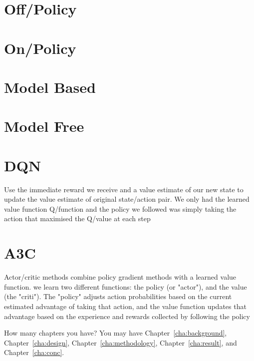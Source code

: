 \section{Off\-/Policy}

\section{On\-/Policy}

\section{Model Based}

\section{Model Free}

\section{DQN}
Use the immediate reward we receive and a value estimate of our new state to update the value estimate of original state\-/action pair. We only had the learned value function Q\-/function and the policy we followed was simply taking the action that maximised the Q\-/value at each step

\section{A3C}
Actor\-/critic methods combine policy gradient methods with a learned value function.
we learn two different functions: the policy (or "actor"), and the value (the "criti"). The "policy" adjusts action probabilities based on the current estimated advantage of taking that action, and the value function updates that advantage based on the experience and rewards collected by following the policy

How many chapters you have? You may have Chapter~\ref{cha:background},
Chapter~\ref{cha:design}, Chapter~\ref{cha:methodology},
Chapter~\ref{cha:result}, and Chapter~\ref{cha:conc}.
